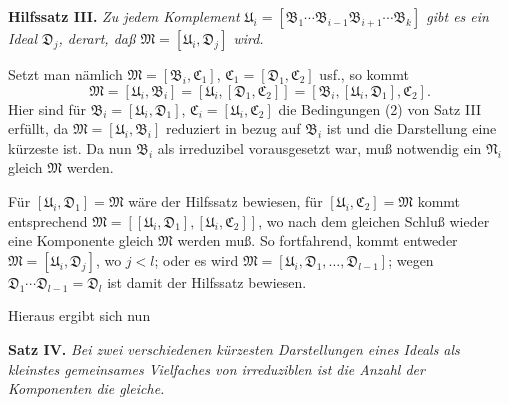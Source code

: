 \documentclass[11pt]{article}
\newcommand{\ideal}[1]{\mathfrak{#1}}
\begin{document}
\textbf{Hilfssatz III.} \emph{Zu jedem Komplement $\ideal U_i=[\ideal B_1\cdots\ideal B_{i-1}\ideal B_{i+1}\cdots\ideal B_k]$ gibt es ein Ideal $\ideal D_j$, derart, daß $\ideal M=[\ideal U_i,\ideal D_j]$ wird.}

Setzt man nämlich $\ideal M=[\ideal B_i,\ideal C_1]$, $\ideal C_1=[\ideal D_1,\ideal C_2]$ usf., so kommt
\[
 \ideal M=[\ideal U_i,\ideal B_i]=[\ideal U_i,[\ideal D_1,\ideal C_2]]=[\ideal B_i,[\ideal U_i,\ideal D_1],\ideal C_2].
\]
Hier sind für $\ideal B_i=[\ideal U_i,\ideal D_1]$, $\ideal C_i=[\ideal U_i,\ideal C_2]$ die Bedingungen (2) von Satz III erfüllt, da $\ideal M=[\ideal U_i,\ideal B_i]$ reduziert in bezug auf $\ideal B_i$ ist und die Darstellung eine kürzeste ist. Da nun $\ideal B_i$ als irreduzibel vorausgesetzt war, muß notwendig ein $\ideal N_i$ gleich $\ideal M$ werden.

Für $[\ideal U_i,\ideal D_1]=\ideal M$ wäre der Hilfssatz bewiesen, für $[\ideal U_i,\ideal C_2]=\ideal M$ kommt entsprechend $\ideal M=[[\ideal U_i,\ideal D_1],[\ideal U_i,\ideal C_2]]$, wo nach dem gleichen Schluß wieder eine Komponente gleich $\ideal M$ werden muß. So fortfahrend, kommt entweder $\ideal M=[\ideal U_i,\ideal D_j]$, wo $j<l$; oder es wird $\ideal M=[\ideal U_i,\ideal D_1,\ldots,\ideal D_{l-1}]$; wegen $\ideal D_1\cdots\ideal D_{l-1}=\ideal D_l$ ist damit der Hilfssatz bewiesen.

Hieraus ergibt sich nun

\textbf{Satz IV.} \emph{Bei zwei verschiedenen kürzesten Darstellungen eines Ideals als kleinstes gemeinsames Vielfaches von irreduziblen ist die Anzahl der Komponenten die gleiche.}
\end{document}
